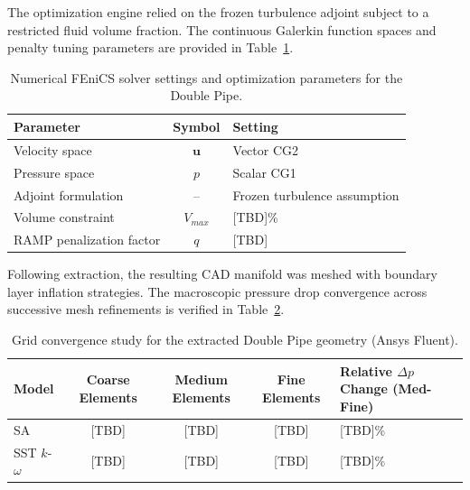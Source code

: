 The optimization engine relied on the frozen turbulence adjoint subject to a restricted fluid volume fraction. The continuous Galerkin function spaces and penalty tuning parameters are provided in Table~\ref{tab:app_doublepipe_numerical}.

\begin{table}[htbp]
	\centering
	\footnotesize
	\caption{Numerical FEniCS solver settings and optimization parameters for the Double Pipe.}
	\label{tab:app_doublepipe_numerical}
	\renewcommand{\arraystretch}{1.2}
	\begin{tabularx}{\textwidth}{l c X}
		\hline
		\textbf{Parameter} & \textbf{Symbol} & \textbf{Setting} \\
		\hline
		Velocity space & $\mathbf{u}$ & Vector CG2 \\
		Pressure space & $p$ & Scalar CG1 \\
		Adjoint formulation & -- & Frozen turbulence assumption \\
		Volume constraint & $V_{max}$ & [TBD]\% \\
		RAMP penalization factor & $q$ & [TBD] \\
		\hline
	\end{tabularx}
\end{table}

Following extraction, the resulting CAD manifold was meshed with boundary layer inflation strategies. The macroscopic pressure drop convergence across successive mesh refinements is verified in Table~\ref{tab:app_doublepipe_mesh}.

\begin{table}[htbp]
	\centering
	\footnotesize
	\caption{Grid convergence study for the extracted Double Pipe geometry (Ansys Fluent).}
	\label{tab:app_doublepipe_mesh}
	\renewcommand{\arraystretch}{1.2}
	\begin{tabularx}{\textwidth}{l c c c X}
		\hline
		\textbf{Model} & \textbf{Coarse Elements} & \textbf{Medium Elements} & \textbf{Fine Elements} & \textbf{Relative $\Delta p$ Change (Med-Fine)} \\
		\hline
		SA & [TBD] & [TBD] & [TBD] & [TBD]\% \\
		SST $k$-$\omega$ & [TBD] & [TBD] & [TBD] & [TBD]\% \\
		\hline
	\end{tabularx}
\end{table}

